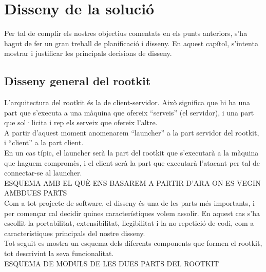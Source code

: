 \chapter{Disseny de la solució}

Per tal de complir els nostres objectius comentats en els punts anteriors, s'ha hagut de fer
un gran treball de planificació i disseny. En aquest capítol, s'intenta mostrar i justificar 
les principals decisions de disseny.

\section{Disseny general del rootkit}

L'arquitectura del rootkit és la de client-servidor. Això significa que hi ha una part que 
s'executa a una màquina que ofereix ``serveis'' (el servidor), i una part que sol·licita i
rep els serveix que ofereix l'altre. \\

A partir d'aquest moment anomenarem ``launcher'' a la part servidor del rootkit, i ``client''
a la part client. \\

En un cas típic, el launcher serà la part del rootkit que s'executarà a la màquina que haguem 
compromès, i el client serà la part que executarà l'atacant per tal de connectar-se al launcher. \\

ESQUEMA AMB EL QUÈ ENS BASAREM A PARTIR D'ARA ON ES VEGIN AMBDUES PARTS \\

Com a tot projecte de software, el disseny és una de les parts més importants, i per començar 
cal decidir quines característiques volem assolir. En aquest cas s'ha escollit la portabilitat, 
extensibilitat, llegibilitat i la no repetició de codi, com a característiques principals del 
nostre disseny. \\

Tot seguit es mostra un esquema dels diferents components que formen el rootkit, tot descrivint 
la seva funcionalitat. \\

ESQUEMA DE MODULS DE LES DUES PARTS DEL ROOTKIT \\
%
%
%    
